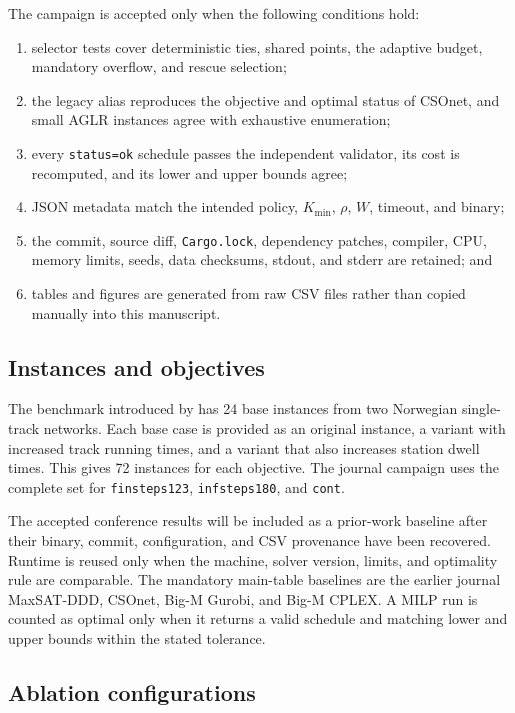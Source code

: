 \documentclass[preprint,12pt,authoryear]{elsarticle}
\begin{document}
The campaign is accepted only when the following conditions hold:
\begin{enumerate}
\item selector tests cover deterministic ties, shared points, the adaptive
budget, mandatory overflow, and rescue selection;
\item the legacy alias reproduces the objective and optimal status of CSOnet,
and small AGLR instances agree with exhaustive enumeration;
\item every \texttt{status=ok} schedule passes the independent validator, its
cost is recomputed, and its lower and upper bounds agree;
\item JSON metadata match the intended policy, $K_{\min}$, $\rho$, $W$,
timeout, and binary;
\item the commit, source diff, \texttt{Cargo.lock}, dependency patches, compiler,
CPU, memory limits, seeds, data checksums, stdout, and stderr are retained; and
\item tables and figures are generated from raw CSV files rather than copied
manually into this manuscript.
\end{enumerate}

\subsection{Instances and objectives}

The benchmark introduced by \citet{Croella2024} has 24 base instances from two
Norwegian single-track networks. Each base case is provided as an original
instance, a variant with increased track running times, and a variant that also
increases station dwell times. This gives 72 instances for each objective. The
journal campaign uses the complete set for \texttt{finsteps123},
\texttt{infsteps180}, and \texttt{cont}.

The accepted conference results will be included as a prior-work baseline after
their binary, commit, configuration, and CSV provenance have been recovered.
Runtime is reused only when the machine, solver version, limits, and optimality
rule are comparable. The mandatory main-table baselines are the earlier journal
MaxSAT-DDD, CSOnet, Big-M Gurobi, and Big-M CPLEX. A MILP run is counted as
optimal only when it returns a valid schedule and matching lower and upper
bounds within the stated tolerance.

\subsection{Ablation configurations}
\end{document}
